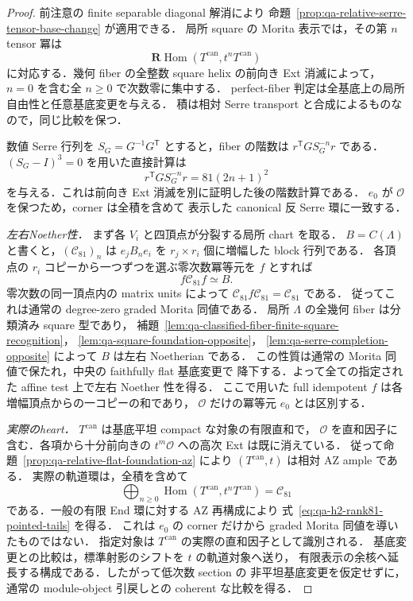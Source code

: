 \begin{proof}
前注意の finite separable diagonal 解消により
命題~\ref{prop:qa-relative-serre-tensor-base-change} が適用できる．
局所 square の Morita 表示では，その第 $n$ tensor 冪は
\[
 \mathbf R\operatorname{Hom}(T^{\mathrm{can}},t^nT^{\mathrm{can}})
\]
に対応する．幾何 fiber の全整数 square helix の前向き Ext 消滅によって，
$n=0$ を含む全 $n\ge0$ で次数零に集中する．
perfect-fiber 判定は全基底上の局所自由性と任意基底変更を与える．
積は相対 Serre transport と合成によるものなので，同じ比較を保つ．

数値 Serre 行列を $S_G=G^{-1}G^{\mathsf T}$ とすると，fiber の階数は
$r^{\mathsf T}GS_G^{-n}r$ である．$(S_G-I)^3=0$ を用いた直接計算は
\[
 r^{\mathsf T}GS_G^{-n}r=81(2n+1)^2
\]
を与える．これは前向き Ext 消滅を別に証明した後の階数計算である．
$e_0$ が $\mathcal O$ を保つため，corner は全積を含めて
表示した canonical 反 Serre 環に一致する．

\emph{左右Noether性．}
まず各 $V_i$ と四頂点が分裂する局所 chart を取る．
$B=C(\Lambda)$ と書くと，$(\mathcal C_{81})_n$ は
$e_jB_ne_i$ を $r_j\times r_i$ 個に増幅した block 行列である．
各頂点の $r_i$ コピーから一つずつを選ぶ零次数冪等元を $f$ とすれば
\[
 f\mathcal C_{81}f\simeq B.
\]
零次数の同一頂点内の matrix units によって
$\mathcal C_{81}f\mathcal C_{81}=\mathcal C_{81}$ である．
従ってこれは通常の degree-zero graded Morita 同値である．
局所 $\Lambda$ の全幾何 fiber は分類済み square 型であり，
補題~\ref{lem:qa-classified-fiber-finite-square-recognition}，
\ref{lem:qa-square-foundation-opposite}，
\ref{lem:qa-serre-completion-opposite} によって $B$ は左右 Noetherian である．
この性質は通常の Morita 同値で保たれ，中央の faithfully flat 基底変更で
降下する．よって全ての指定された affine test 上で左右 Noether 性を得る．
ここで用いた full idempotent $f$ は各増幅頂点からの一コピーの和であり，
$\mathcal O$ だけの冪等元 $e_0$ とは区別する．

\emph{実際のheart．}
$T^{\mathrm{can}}$ は基底平坦 compact な対象の有限直和で，
$\mathcal O$ を直和因子に含む．各項から十分前向きの
$t^m\mathcal O$ への高次 Ext は既に消えている．
従って命題~\ref{prop:qa-relative-flat-foundation-az} により
$(T^{\mathrm{can}},t)$ は相対 AZ ample である．
実際の軌道環は，全積を含めて
\[
 \bigoplus_{n\ge0}\operatorname{Hom}(T^{\mathrm{can}},t^nT^{\mathrm{can}})
    =\mathcal C_{81}
\]
である．一般の有限 End 環に対する AZ 再構成により
式~\eqref{eq:qa-h2-rank81-pointed-tails} を得る．
これは $e_0$ の corner だけから graded Morita 同値を導いたものではない．
指定対象は $T^{\mathrm{can}}$ の実際の直和因子として識別される．
基底変更との比較は，標準射影のシフトを $t$ の軌道対象へ送り，
有限表示の余核へ延長する構成である．したがって低次数 section の
非平坦基底変更を仮定せずに，通常の module-object 引戻しとの
coherent な比較を得る．
\end{proof}

